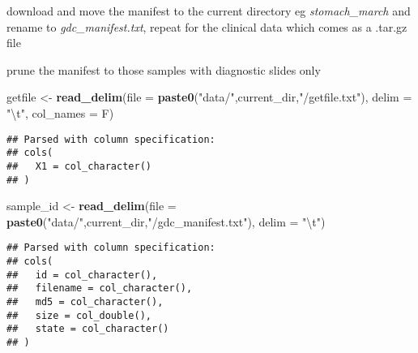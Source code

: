 \documentclass[]{article}
\newenvironment{Shaded}{\begin{snugshade}}{\end{snugshade}}
\newcommand{\KeywordTok}[1]{\textcolor[rgb]{0.13,0.29,0.53}{\textbf{#1}}}
\newcommand{\DataTypeTok}[1]{\textcolor[rgb]{0.13,0.29,0.53}{#1}}
\newcommand{\CharTok}[1]{\textcolor[rgb]{0.31,0.60,0.02}{#1}}
\newcommand{\StringTok}[1]{\textcolor[rgb]{0.31,0.60,0.02}{#1}}
\newcommand{\CommentTok}[1]{\textcolor[rgb]{0.56,0.35,0.01}{\textit{#1}}}
\newcommand{\FunctionTok}[1]{\textcolor[rgb]{0.00,0.00,0.00}{#1}}
\newcommand{\VariableTok}[1]{\textcolor[rgb]{0.00,0.00,0.00}{#1}}
\newcommand{\OperatorTok}[1]{\textcolor[rgb]{0.81,0.36,0.00}{\textbf{#1}}}
\newcommand{\NormalTok}[1]{#1}
\begin{document}
download and move the manifest to the current directory eg
\emph{stomach\_march} and rename to \emph{gdc\_manifest.txt}, repeat for
the clinical data which comes as a .tar.gz file

prune the manifest to those samples with diagnostic slides only

\begin{Shaded}
\end{Shaded}

\begin{Shaded}
\begin{Highlighting}[]
\NormalTok{getfile <-}\StringTok{ }\KeywordTok{read_delim}\NormalTok{(}\DataTypeTok{file =} \KeywordTok{paste0}\NormalTok{(}\StringTok{"data/"}\NormalTok{,current_dir,}\StringTok{"/getfile.txt"}\NormalTok{), }\DataTypeTok{delim =} \StringTok{"}\CharTok{\textbackslash{}t}\StringTok{"}\NormalTok{, }\DataTypeTok{col_names =}\NormalTok{ F)}
\end{Highlighting}
\end{Shaded}

\begin{verbatim}
## Parsed with column specification:
## cols(
##   X1 = col_character()
## )
\end{verbatim}

\begin{Shaded}
\begin{Highlighting}[]
\NormalTok{sample_id <-}\StringTok{ }\KeywordTok{read_delim}\NormalTok{(}\DataTypeTok{file =} \KeywordTok{paste0}\NormalTok{(}\StringTok{"data/"}\NormalTok{,current_dir,}\StringTok{"/gdc_manifest.txt"}\NormalTok{), }\DataTypeTok{delim =} \StringTok{"}\CharTok{\textbackslash{}t}\StringTok{"}\NormalTok{)}
\end{Highlighting}
\end{Shaded}

\begin{verbatim}
## Parsed with column specification:
## cols(
##   id = col_character(),
##   filename = col_character(),
##   md5 = col_character(),
##   size = col_double(),
##   state = col_character()
## )
\end{verbatim}
\end{document}
